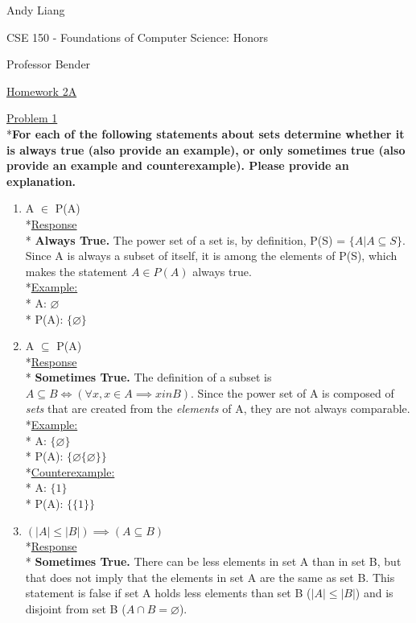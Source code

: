 \documentclass[12pt]{article}
\begin{document}
\begin{flushleft}
Andy Liang

CSE 150 - Foundations of Computer Science: Honors

Professor Bender
\end{flushleft}
\medskip
\centerline{\uline{Homework 2A}}
\bigskip\bigskip

\noindent
\uline{Problem 1}
\\*\textbf{For each of the following statements about sets determine whether it is always true (also provide an example), or only sometimes true (also provide an example and counterexample). Please provide an explanation.}
\begin{enumerate}
\item A $\in$ P(A)
\smallskip
\\*\uline{Response}
\\* \textbf{Always True.} The power set of a set is, by definition, P(S) = $\{A | A \subseteq S\}$. Since A is always a subset of itself, it is among the elements of P(S), which makes the statement $A \in P(A)$ always true. 
\\*\uline{Example:}
\\* A: $\varnothing$
\\* P(A): $\{\varnothing\}$
\smallskip
\item A $\subseteq$ P(A)
\smallskip
\\*\uline{Response}
\\* \textbf{Sometimes True.} The definition of a subset is $A \subseteq B \iff (\forall x, x \in A \implies x in B).$ Since the power set of A is composed of \textit{sets} that are created from the \textit{elements} of A, they are not always comparable. 
\\*\uline{Example:}
\\* A: $\{\varnothing\}$
\\* P(A): $\{\varnothing \{\varnothing\}\}$
\\*\uline{Counterexample:}
\\* A: $\{1\}$
\\* P(A): $\{ \{1\} \}$
\smallskip
\item $(|A| \leq |B|) \implies (A \subseteq B)$
\smallskip
\\*\uline{Response}
\\* \textbf{Sometimes True.} There can be less elements in set A than in set B, but that does not imply that the elements in set A are the same as set B. This statement is false if set A holds less elements than set B ($|A| \leq |B|$) and is disjoint from set B ($A \cap B = \varnothing$).

\end{enumerate}
\end{document}
